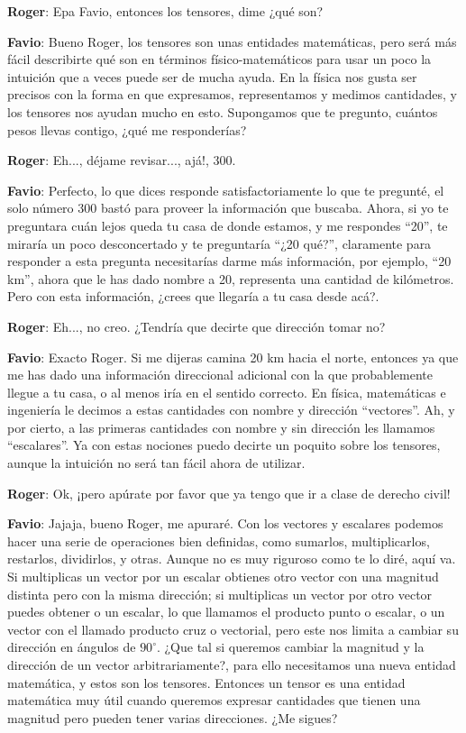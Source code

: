 \documentclass[a4paper,10pt]{article}
\numberwithin{equation}{section}
\begin{document}
\vspace{.3cm}

\textbf{\color{green}Roger}: Epa Favio, entonces los tensores, dime ¿qué son?

\textbf{\color{blue}Favio}: Bueno Roger, los tensores son unas entidades matemáticas, pero
será más fácil describirte qué son en términos físico-matemáticos para usar un poco la 
intuición que a veces puede ser de mucha ayuda. En la física nos gusta ser precisos con 
la forma en que expresamos, representamos y medimos cantidades, y los tensores nos ayudan
mucho en esto. Supongamos que te pregunto, cuántos pesos llevas contigo, ¿qué me responderías?

\textbf{\color{green}Roger}: Eh..., déjame revisar..., ajá!, 300.

\textbf{\color{blue}Favio}: Perfecto, lo que dices responde satisfactoriamente lo que te 
pregunté, el solo número 300 bastó para proveer la información que buscaba. Ahora, si yo
te preguntara cuán lejos queda tu casa de donde estamos, y me respondes ``20'', te miraría
un poco desconcertado y te preguntaría ``¿20 qué?'', claramente para responder a esta 
pregunta necesitarías darme más información, por ejemplo, ``20 km'', ahora que le has 
dado nombre a 20, representa una cantidad de kilómetros. Pero con esta información, 
¿crees que llegaría a tu casa desde acá?.

\textbf{\color{green}Roger}: Eh..., no creo. ¿Tendría que decirte que dirección tomar no?

\textbf{\color{blue}Favio}: Exacto Roger. Si me dijeras camina 20 km hacia el norte, entonces 
ya que me has dado una información direccional adicional con la que probablemente llegue a tu casa,
o al menos iría en el sentido correcto. En física, matemáticas e ingeniería le decimos 
a estas cantidades con nombre y dirección ``vectores''. Ah, y por cierto, a las primeras 
cantidades con nombre y sin dirección les llamamos ``escalares''. Ya con estas nociones 
puedo decirte un poquito sobre los tensores, aunque la intuición no será tan fácil
ahora de utilizar.

\textbf{\color{green}Roger}: Ok, ¡pero apúrate por favor que ya tengo que ir a clase de 
derecho civil!

\textbf{\color{blue}Favio}: Jajaja, bueno Roger, me apuraré. Con los vectores y escalares
podemos hacer una serie de operaciones bien definidas, como sumarlos, multiplicarlos, restarlos,
dividirlos, y otras. Aunque no es muy riguroso como te lo diré, aquí va. Si multiplicas 
un vector por un escalar obtienes otro vector con una magnitud distinta pero con 
la misma dirección; si multiplicas un vector por otro vector puedes obtener o un escalar,
lo que llamamos el producto punto o escalar, o un vector con el llamado producto cruz o 
vectorial, pero este nos limita a cambiar su dirección en ángulos de $90^\circ$. ¿Que tal 
si queremos cambiar la magnitud y la dirección de un vector arbitrariamente?, para ello
necesitamos una nueva entidad matemática, y estos son los tensores. Entonces un tensor 
es una entidad matemática muy útil cuando queremos expresar cantidades que tienen una 
magnitud pero pueden tener varias direcciones. ¿Me sigues?
\end{document}

